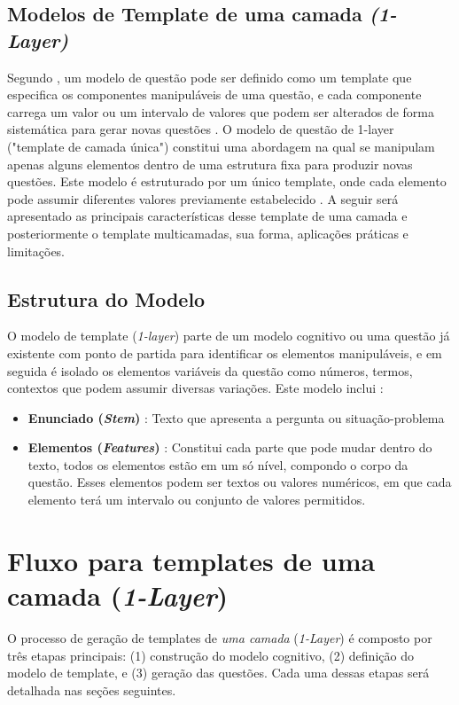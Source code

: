 \subsection{Modelos de Template de uma camada \textit{(1-Layer)}}

Segundo \parencite{gierl2021}, um modelo de questão pode ser definido como um template que especifica os componentes manipuláveis de uma questão, e cada componente carrega um valor ou um intervalo de valores que podem ser alterados de forma sistemática para gerar novas questões . O modelo de questão de 1-layer ("template de camada única") constitui uma abordagem na qual se manipulam apenas alguns elementos dentro de uma estrutura fixa para produzir novas questões. Este modelo é estruturado por um único template, onde cada elemento pode assumir diferentes valores previamente estabelecido \parencite{lai2013}. A seguir será apresentado as principais características desse template de uma camada e posteriormente o template multicamadas, sua forma, aplicações práticas e limitações.

\subsection{Estrutura do Modelo}

O modelo de template (\textit{1-layer}) parte de um modelo cognitivo ou uma questão já existente com ponto de partida para identificar os elementos manipuláveis, e em seguida é isolado os elementos variáveis da questão como números, termos, contextos que podem assumir diversas variações. Este modelo inclui : 

\begin{itemize}
    \item \textbf{Enunciado (\textit{Stem})} : Texto que apresenta a pergunta ou situação-problema
    \item \textbf{Elementos (\textit{Features})} : Constitui cada parte que pode mudar dentro do texto, todos os elementos estão em um só nível, compondo o corpo da questão. Esses elementos podem ser textos ou valores numéricos, em que cada elemento terá um intervalo ou conjunto de valores permitidos.
\end{itemize}

\section{Fluxo para templates de uma camada (\textit{1-Layer})}

O processo de geração de templates de \textit{uma camada} (\textit{1-Layer})  é composto por três etapas principais: (1) construção do modelo cognitivo, (2) definição do modelo de template, e (3) geração das questões. Cada uma dessas etapas será detalhada nas seções seguintes. 

